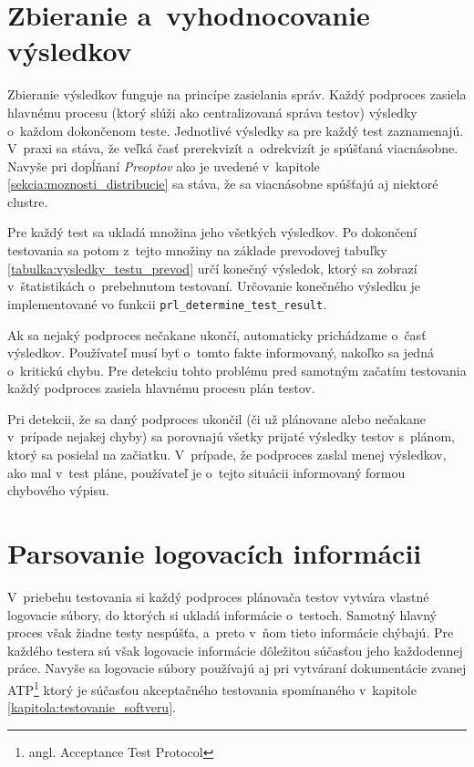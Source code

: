 \section{Zbieranie a~vyhodnocovanie výsledkov}
\label{sekcia:zbieranie_vysledkov}
Zbieranie výsledkov funguje na princípe zasielania správ. 
Každý podproces zasiela hlavnému procesu (ktorý slúži ako centralizovaná
správa testov) výsledky o~každom dokončenom teste. Jednotlivé výsledky sa
pre každý test zaznamenajú. V~praxi sa stáva, že veľká časť prerekvizít
a~odrekvizít je spúšťaná viacnásobne. Navyše pri dopĺňaní \textit{Preoptov}
ako je uvedené v~kapitole \ref{sekcia:moznosti_distribucie} sa stáva, 
že sa viacnásobne spúšťajú aj niektoré clustre. 

Pre každý test sa ukladá množina jeho všetkých výsledkov. 
Po dokončení testovania sa potom z~tejto množiny na základe prevodovej
tabuľky \ref{tabulka:vysledky_testu_prevod} určí konečný výsledok,
ktorý sa zobrazí v~štatistikách o~prebehnutom testovaní.
Určovanie konečného výsledku je implementované vo funkcii 
\texttt{prl\_determine\_test\_result}.

Ak sa nejaký podproces nečakane ukončí, automaticky prichádzame 
o~časť výsledkov. Používateľ musí byť o~tomto fakte informovaný, 
nakoľko sa jedná o~kritickú chybu. Pre detekciu tohto problému pred 
samotným začatím testovania každý podproces zasiela hlavnému procesu 
plán testov.

Pri detekcii, že sa daný podproces ukončil (či už plánovane alebo 
nečakane v~prípade nejakej chyby) sa porovnajú všetky prijaté výsledky 
testov s~plánom, ktorý sa posielal na začiatku. V~prípade, že podproces 
zaslal menej výsledkov, ako mal v~test pláne, používateľ je o~tejto 
situácii informovaný formou chybového výpisu. 

\section{Parsovanie logovacích informácii}
\label{sekcia:parsovanie_logov}
V~priebehu testovania si každý podproces plánovača testov vytvára vlastné
logovacie súbory, do ktorých si ukladá informácie o~testoch.
Samotný hlavný proces však žiadne testy nespúšťa, a~preto v~ňom tieto 
informácie chýbajú. Pre každého testera sú však logovacie informácie 
dôležitou súčasťou jeho každodennej práce. Navyše sa logovacie súbory 
používajú aj pri vytváraní dokumentácie zvanej 
ATP\footnote{angl. Acceptance Test Protocol} ktorý je súčasťou
akceptačného testovania spomínaného v~kapitole 
\ref{kapitola:testovanie_softveru}.

